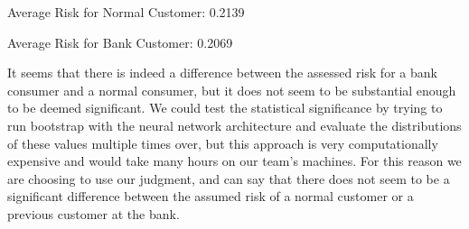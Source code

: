 \documentclass[12pt]{article}
\begin{document}
	Average Risk for Normal Customer: 0.2139 
	
	Average Risk for Bank Customer: 0.2069
	
	It seems that there is indeed a difference between the assessed risk for a bank consumer and a normal consumer, but it does not seem to be substantial enough to be deemed significant. We could test the statistical significance by trying to run bootstrap with the neural network architecture and evaluate the distributions of these values multiple times over, but this approach is very computationally expensive and would take many hours on our team's machines. For this reason we are choosing to use our judgment, and can say that there does not seem to be a significant difference between the assumed risk of a normal customer or a previous customer at the bank. 
	

	
\end{document}
